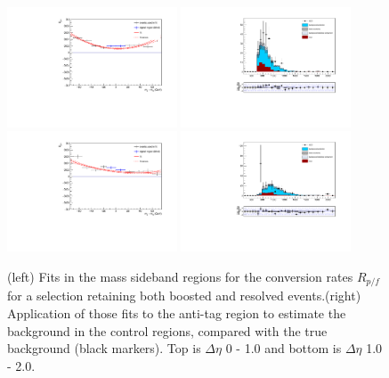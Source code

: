 \begin{figure}[h]
\centering
\includegraphics[width=0.45\textwidth]{F5/HH4b2p1SR_Fit_BG_retain_dEta0_MCSR.pdf}
\includegraphics[width=0.45\textwidth]{F5/HH4b2p1_Plot_BG_retain_dEta0_MCSR.pdf}\\
\includegraphics[width=0.45\textwidth]{F5/HH4b2p1SR_Fit_BG_retain_dEta1_MCSR.pdf}
\includegraphics[width=0.45\textwidth]{F5/HH4b2p1_Plot_BG_retain_dEta1_MCSR.pdf}
\caption{(left) Fits in the mass sideband regions for the conversion rates $R_{p/f}$ for a selection retaining both boosted and resolved events.(right) Application of those fits to the anti-tag region to estimate the background in the control regions, compared with the true background (black markers). Top is $\Delta\eta$ 0 - 1.0 and bottom is $\Delta\eta$ 1.0 - 2.0.}
\label{fig:closureMC2}
\end{figure}

